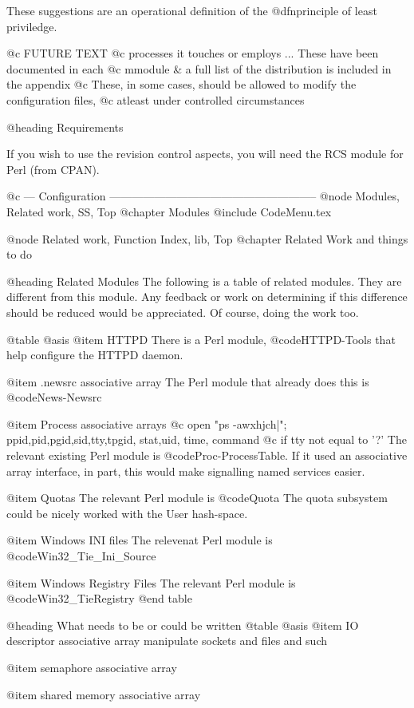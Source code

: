 {{These suggestions are an operational definition of the @dfn{principle of least
priviledge}.

@c FUTURE TEXT
@c processes it touches or employs ... These have been documented in each
@c mmodule & a full list of the distribution is included in the appendix
@c These, in some cases, should be allowed to modify the configuration files,
@c atleast under controlled circumstances


@heading Requirements

If you wish to use the revision control aspects, you will need the RCS module
for Perl (from CPAN).


@c --- Configuration --------------------------------------------------------
@node Modules, Related work, SS, Top
@chapter Modules
@include CodeMenu.tex

@node Related work, Function Index, lib, Top
@chapter Related Work and things to do

@heading Related Modules
The following is a table of related modules.  They are different from this
module.  Any feedback or work on determining if this difference should be
reduced would be appreciated.  Of course, doing the work too.

@table @asis
@item HTTPD
There is a Perl module, @code{HTTPD-Tools} that help configure the HTTPD
daemon.

@item .newsrc associative array
The Perl module that already does this is @code{News-Newsrc}

@item Process associative arrays
@c open "ps -awxhjch|"; ppid,pid,pgid,sid,tty,tpgid, stat,uid, time, command
@c if tty not equal to '?'
The relevant existing Perl module is @code{Proc-ProcessTable}.
If it used an associative array interface, in part, this would make
signalling named services easier.

@item Quotas
The relevant Perl module is @code{Quota}
The quota subsystem could be nicely worked with the User hash-space.

@item Windows INI files
The relevenat Perl module is @code{Win32_Tie_Ini_Source}

@item Windows Registry Files
The relevant Perl module is @code{Win32_TieRegistry}
@end table

@heading What needs to be or could be written
@table @asis
@item IO descriptor associative array
manipulate sockets and files and such

@item semaphore associative array

@item shared memory associative array

}}
